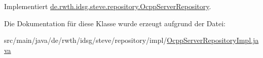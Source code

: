 Implementiert \hyperlink{interfacede_1_1rwth_1_1idsg_1_1steve_1_1repository_1_1_ocpp_server_repository_a28a5a4ade29b669cfe501e345babfa9b}{de.\-rwth.\-idsg.\-steve.\-repository.\-Ocpp\-Server\-Repository}.



Die Dokumentation für diese Klasse wurde erzeugt aufgrund der Datei\-:\begin{DoxyCompactItemize}
\item 
src/main/java/de/rwth/idsg/steve/repository/impl/\hyperlink{_ocpp_server_repository_impl_8java}{Ocpp\-Server\-Repository\-Impl.\-java}\end{DoxyCompactItemize}
